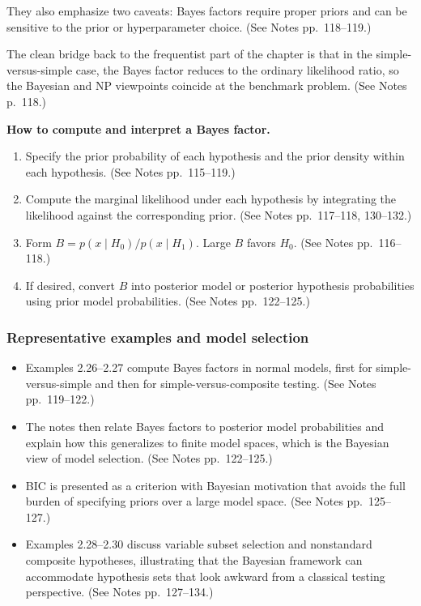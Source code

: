 They also emphasize two caveats: Bayes factors require proper priors and can be sensitive to the prior or hyperparameter choice. (See Notes pp.~118--119.)

The clean bridge back to the frequentist part of the chapter is that in the simple-versus-simple case, the Bayes factor reduces to the ordinary likelihood ratio, so the Bayesian and NP viewpoints coincide at the benchmark problem. (See Notes p.~118.)

\begin{mybox}
\textbf{How to compute and interpret a Bayes factor.}
\begin{enumerate}
    \item Specify the prior probability of each hypothesis and the prior density within each hypothesis. (See Notes pp.~115--119.)
    \item Compute the marginal likelihood under each hypothesis by integrating the likelihood against the corresponding prior. (See Notes pp.~117--118, 130--132.)
    \item Form $B=p(x \mid H_0)/p(x \mid H_1)$. Large $B$ favors $H_0$. (See Notes pp.~116--118.)
    \item If desired, convert $B$ into posterior model or posterior hypothesis probabilities using prior model probabilities. (See Notes pp.~122--125.)
\end{enumerate}
\end{mybox}

\subsubsection{Representative examples and model selection}
\begin{itemize}
    \item Examples 2.26--2.27 compute Bayes factors in normal models, first for simple-versus-simple and then for simple-versus-composite testing. (See Notes pp.~119--122.)
    \item The notes then relate Bayes factors to posterior model probabilities and explain how this generalizes to finite model spaces, which is the Bayesian view of model selection. (See Notes pp.~122--125.)
    \item BIC is presented as a criterion with Bayesian motivation that avoids the full burden of specifying priors over a large model space. (See Notes pp.~125--127.)
    \item Examples 2.28--2.30 discuss variable subset selection and nonstandard composite hypotheses, illustrating that the Bayesian framework can accommodate hypothesis sets that look awkward from a classical testing perspective. (See Notes pp.~127--134.)
\end{itemize}

